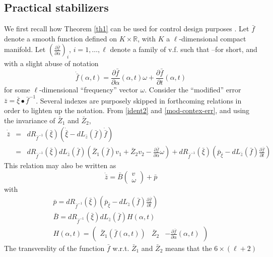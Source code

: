 \documentclass[a4paper,twoside]{article}
\def \RR {{\mathbb R}}
\begin{document}
\subsection{Practical stabilizers}

We first recall how Theorem \ref{th1} can be used for control design purposes \cite{ms03}. 
Let $\bar f$ denote a smooth function defined on $K \times \RR$, with $K$ a $\ell$-dimensional compact manifold. 
Let $(\frac{\partial \bar f}{\partial \alpha})_i$, $i=1,\ldots,\ell$ denote a family of v.f. such that --for short, 
and with a slight abuse of notation
\[
\dot{\bar f}(\alpha,t)=\frac{\partial \bar f}{\partial \alpha}(\alpha,t) \omega 
+ \frac{\partial \bar f}{\partial t}(\alpha,t)
\]
for some $\ell$-dimensional ``frequency'' vector $\omega$.
Consider the ``modified'' error $\bar{z}=\bar{\xi} \bullet {\bar f}^{-1}$. Several indexes are purposely
 skipped in forthcoming relations in order to lighten up the notation. From \eqref{ident2} and \eqref{mod-contex-err}, and 
using the invariance of $\bar Z_1$ and $\bar Z_2$,
\[
\begin{array}{lll}
\dot{\bar{z}} & = & dR_{\bar f^{-1}}(\bar{\xi}) \left( \dot{\bar{\xi}}-dL_{\bar{z}}(\bar f) \dot{\bar f} \right) \\
~ & = &  dR_{\bar f^{-1}}(\bar{\xi})dL_{\bar{z}}(\bar f) \left( \bar{Z}_1(\bar f)v_1+\bar{Z}_2 v_2 -
\frac{\partial \bar f}{\partial \alpha} \omega \right) 
+   dR_{\bar f^{-1}}(\bar \xi) \left( \bar{p}_{\bar{\xi}}- dL_{\bar{z}}(\bar f) 
\frac{\partial \bar f}{\partial t} \right)
\end{array}
\]
This relation may also be written as
\begin{equation} \label{dotz}
\dot{\bar{z}}=\bar{B} \begin{pmatrix} v \\ \omega \end{pmatrix} + \bar{p}
\end{equation}
with
\[
\begin{array}{l}
\bar{p}=dR_{\bar f^{-1}}(\bar \xi) \left( \bar{p}_{\bar{\xi}}- dL_{\bar{z}}(\bar f) 
\frac{\partial \bar f}{\partial t} \right)\\
\bar{B}=dR_{\bar f^{-1}}(\bar{\xi})dL_{\bar{z}}(\bar f)H(\alpha,t) \\
H(\alpha,t)=\begin{pmatrix} \bar{Z}_1(\bar f(\alpha,t)) & \bar{Z}_2 &  
-\frac{\partial \bar f}{\partial \alpha}(\alpha,t) 
\end{pmatrix}
\end{array}
\]
The transverslity of the function $\bar f$ w.r.t. $\bar{Z}_1$ and $\bar{Z}_2$ means that the $6 \times (\ell+2)$ 
\end{document}
